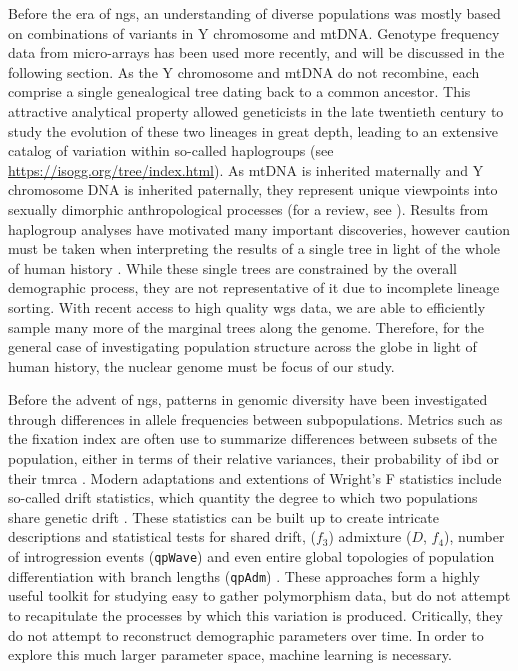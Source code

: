 Before the era of \gls{ngs}, an understanding of diverse populations was mostly based on combinations of variants in Y chromosome and \gls{mtDNA}. Genotype frequency data from micro-arrays has been used more recently, and will be discussed in the following section. As the Y chromosome and mtDNA do not recombine, each comprise a single genealogical tree dating back to a common ancestor. This attractive analytical property allowed geneticists in the late twentieth century to study the evolution of these two lineages in great depth, leading to an extensive catalog of variation within so-called haplogroups (see \url{https://isogg.org/tree/index.html}). As \gls{mtDNA} is inherited maternally and Y chromosome DNA is inherited paternally, they represent unique viewpoints into sexually dimorphic anthropological processes (for a review, see \textcite{Kivisild2015}). Results from haplogroup analyses have motivated many important discoveries, however caution must be taken when interpreting the results of a single tree in light of the whole of human history \cite{Rubinoff2005}. While these single trees are constrained by the overall demographic process, they are not representative of it due to incomplete lineage sorting. With recent access to high quality \gls{wgs} data, we are able to efficiently sample many more of the marginal trees along the genome. Therefore, for the general case of investigating population structure across the globe in light of human history, the nuclear genome must be focus of our study.

Before the advent of \gls{ngs}, patterns in genomic diversity have been investigated through differences in allele frequencies between subpopulations. 
Metrics such as the fixation index are often use to summarize differences between subsets of the population, either in terms of their relative variances, their probability of \gls{ibd} or their \gls{tmrca} \cite{Holsinger2009}. 
Modern adaptations and extentions of Wright's F statistics include so-called drift statistics, which quantity the degree to which two populations share genetic drift \cite{Patterson2012}. These statistics can be built up to create intricate descriptions and statistical tests for shared drift, ($f_3$) admixture ($D$, $f_4$), number of introgression events ({\tt qpWave}) and even entire global topologies of population differentiation with branch lengths ({\tt qpAdm}) \cite{Petr2019}. These approaches form a highly useful toolkit for studying easy to gather polymorphism data, but do not attempt to recapitulate the processes by which this variation is produced. Critically, they do not attempt to reconstruct demographic parameters over time. In order to explore this much larger parameter space, machine learning is necessary. 

